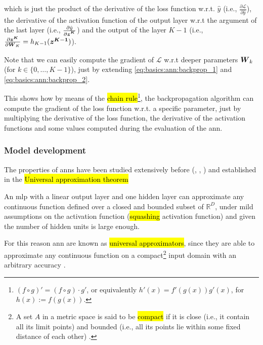 \noindent which is just the product of the derivative of the loss function w.r.t. $\hat{y}$ (i.e., $\frac{\partial \mathcal{L}}{\partial \hat{y}}$), the derivative of the activation function of the output layer w.r.t the argument of the last layer (i.e., $\frac{\partial \hat{y}}{\partial \boldsymbol{z^K}}$) and the output of the layer $K-1$ (i.e., $\frac{\partial \boldsymbol{z^K}}{\partial \boldsymbol{W}_K}=h_{K-1}(\boldsymbol{z^{K-1}})$).

Note that we can easily compute the gradient of $\mathcal{L}$ w.r.t deeper parameters $\boldsymbol{W}_k$ (for $k\in\{0, \dots, K-1\}$), just by extending \ref{eq:basics:ann:backprop_1} and \ref{eq:basics:ann:backprop_2}.

This shows how by means of the \hl{chain rule}\footnote{$(f \circ g)'=(f \circ g) \cdot g'$, or equivalently $h'(x)=f'(g(x))g'(x)$, for $h(x):=f(g(x))$.}, the backpropagation algorithm can compute the gradient of the loss function w.r.t. a specific parameter, just by multiplying the derivative of the loss function, the derivative of the activation functions and some values computed during the evaluation of the \gls{ann}.

\subsubsection{Model development}

The properties of \glspl{ann} have been studied extensively before (\cite{cybenko1989approximation}, \cite{hornik1989multilayer}, \cite{funahashi1989approximate}) and established in the \hl{Universal approximation theorem}

\begin{theorem}
  An \gls{mlp} with a linear output layer and one hidden layer can approximate any continuous function defined over a closed and bounded subset of $\mathbb{R}^D$, under mild assumptions on the activation function (\hl{squashing} activation function) and given the number of hidden units is large enough.
\end{theorem}

For this reason \gls{ann} are known as \hl{universal approximators}, since they are able to approximate any continuous function on a compact\footnote{A set $A$ in a metric space is said to be \hl{compact} if it is close (i.e., it contain all its limit points) and bounded (i.e., all its points lie within some fixed distance of each other) \cite{bartle2000introduction}.} input domain with an arbitrary accuracy \cite{bishop2006pattern}.

